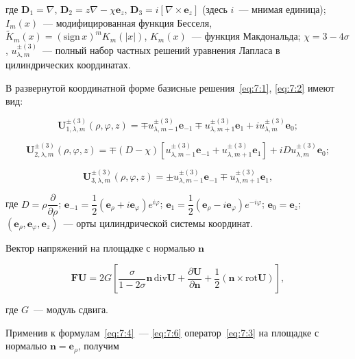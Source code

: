 \noindent где $\mathbf{D}_1=\nabla$, $\mathbf{D}_2=z\nabla-\chi\mathbf{e}_z$, $\mathbf{D}_3=i[\nabla\times\mathbf{e}_z]$ (здесь $i$~--- мнимая единица); $I_m(x)$~--- модифицированная функция Бесселя, $\tilde K_m(x)=(\mathrm{sign}\,x)^m K_m(|x|)$, $K_m(x)$~--- функция Макдональда; $\chi=3-4\sigma$, $u_{\lambda,m}^{\pm(3)}$~--- полный набор частных решений уравнения Лапласа в цилиндрических координатах.

В развернутой координатной форме базисные решения~\eqref{eq:7:1}, \eqref{eq:7:2} имеют вид:

\begin{equation}
\mathbf{U}_{1,\lambda,m}^{\pm(3)}(\rho,\varphi,z)=\mp u_{\lambda,m-1}^{\pm(3)}\mathbf{e}_{-1}\mp u_{\lambda,m+1}^{\pm(3)}\mathbf{e}_1+iu_{\lambda,m}^{\pm(3)}\mathbf{e}_0;
\label{eq:7:4}
\end{equation}

\begin{equation}
\mathbf{U}_{2,\lambda,m}^{\pm(3)}(\rho,\varphi,z)=\mp(D-\chi)\left[u_{\lambda,m-1}^{\pm(3)}\mathbf{e}_{-1}+
u_{\lambda,m+1}^{\pm(3)}\mathbf{e}_1\right]+iDu_{\lambda,m}^{\pm(3)}\mathbf{e}_0;
\label{eq:7:5}
\end{equation}

\begin{equation}
\mathbf{U}_{3,\lambda,m}^{\pm(3)}(\rho,\varphi,z)=\pm u_{\lambda,m-1}^{\pm(3)}\mathbf{e}_{-1}\mp u_{\lambda,m+1}^{\pm(3)}\mathbf{e}_1,
\label{eq:7:6}
\end{equation}

\noindent где $D=\rho\dfrac{\partial}{\partial\rho}$; $\mathbf{e}_{-1}=\dfrac{1}{2}(\mathbf{e}_\rho+i\mathbf{e}_\varphi)e^{i\varphi}$; $\mathbf{e}_1=\dfrac{1}{2}(\mathbf{e}_\rho-i\mathbf{e}_\varphi)e^{-i\varphi}$; $\mathbf{e}_0=\mathbf{e}_z$; $(\mathbf{e}_\rho,\mathbf{e}_\varphi,\mathbf{e}_z)$~--- орты цилиндрической системы координат.

Вектор напряжений на площадке с нормалью $\mathbf{n}$

\begin{equation}
\mathbf{FU}=2G\left[\frac{\sigma}{1-2\sigma}\mathbf{n}\,\mathrm{div}\mathbf{U}+\frac{\partial\mathbf{U}}{\partial\mathbf{n}}+\frac{1}{2}(\mathbf{n}\times\mathrm{rot}\mathbf{U})\right],
\label{eq:7:3}
\end{equation}

\noindent где $G$~--- модуль сдвига.

Применив к формулам~\eqref{eq:7:4}~--- \eqref{eq:7:6} оператор~\eqref{eq:7:3} на площадке с нормалью $\mathbf{n}=\mathbf{e}_\rho$, получим

